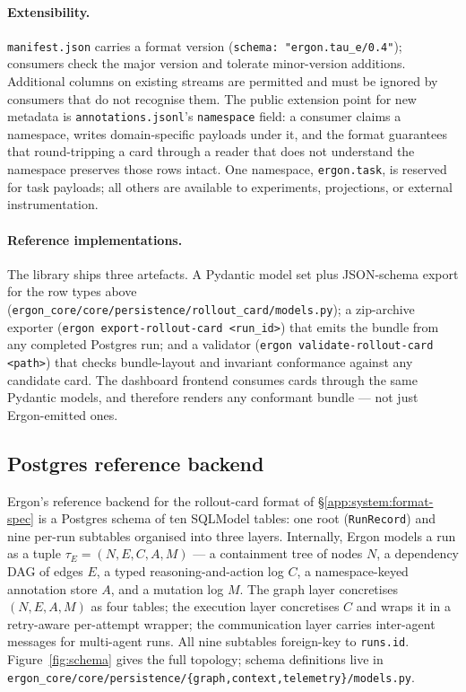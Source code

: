 \documentclass{article}
\begin{document}
\paragraph{Extensibility.} \texttt{manifest.json} carries a
format version (\texttt{schema: "ergon.tau\_e/0.4"}); consumers
check the major version and tolerate minor-version additions.
Additional columns on existing streams are permitted and must
be ignored by consumers that do not recognise them. The public
extension point for new metadata is
\texttt{annotations.jsonl}'s \texttt{namespace} field: a
consumer claims a namespace, writes domain-specific payloads
under it, and the format guarantees that round-tripping a card
through a reader that does not understand the namespace
preserves those rows intact. One namespace,
\texttt{ergon.task}, is reserved for task payloads; all others
are available to experiments, projections, or external
instrumentation.

\paragraph{Reference implementations.} The library ships three
artefacts. A Pydantic model set plus JSON-schema export for
the row types above
(\texttt{ergon\_core/core/persistence/rollout\_card/models.py});
a zip-archive exporter
(\texttt{ergon export-rollout-card <run\_id>}) that emits the
bundle from any completed Postgres run; and a validator
(\texttt{ergon validate-rollout-card <path>}) that checks
bundle-layout and invariant conformance against any candidate
card. The dashboard frontend consumes cards through the same
Pydantic models, and therefore renders any conformant bundle
--- not just Ergon-emitted ones.

\subsection{Postgres reference backend}
\label{app:system:postgres}

Ergon's reference backend for the rollout-card format of
\S\ref{app:system:format-spec} is a Postgres schema of ten
SQLModel tables: one root (\texttt{RunRecord}) and nine per-run
subtables organised into three layers. Internally, Ergon models
a run as a tuple $\tau_E = (N, E, C, A, M)$ --- a containment
tree of nodes $N$, a dependency DAG of edges $E$, a typed
reasoning-and-action log $C$, a namespace-keyed annotation
store $A$, and a mutation log $M$. The graph layer concretises
$(N, E, A, M)$ as four tables; the execution layer concretises
$C$ and wraps it in a retry-aware per-attempt wrapper; the communication layer carries inter-agent messages
for multi-agent runs. All nine subtables foreign-key to
\texttt{runs.id}. Figure~\ref{fig:schema} gives the full
topology; schema definitions live in
\texttt{ergon\_core/core/persistence/}\allowbreak\texttt{\{graph,context,telemetry\}/models.py}.
\end{document}
